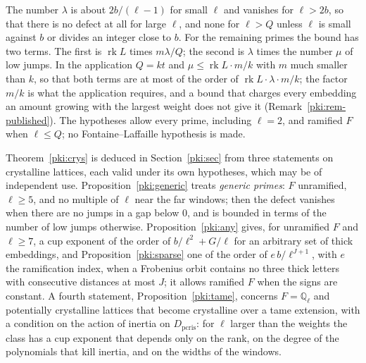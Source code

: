 \documentclass[10pt]{amsart}
\theoremstyle{definition}
\theoremstyle{remark}
\begin{document}
The number $\lambda$ is about $2b/(\ell-1)$ for small $\ell$ and vanishes for $\ell>2b$, so that
there is no defect at all for large $\ell$, and none for $\ell>Q$ unless $\ell$ is small against
$b$ or divides an integer close to $b$. For the remaining primes the bound has two terms. The
first is $\operatorname{rk}L$ times $m\lambda/Q$; the second is $\lambda$ times the number $\mu$ of
low jumps. In the application $Q=kt$ and $\mu\le\operatorname{rk}L\cdot m/k$ with $m$ much
smaller than $k$, so that both terms are at most of the order of
$\operatorname{rk}L\cdot\lambda\cdot m/k$; the factor $m/k$ is what the application requires, and
a bound that charges every embedding an amount growing with the largest weight does not give it
(Remark~\ref{pki:rem-published}). The hypotheses allow every prime, including $\ell=2$, and
ramified $F$ when $\ell\le Q$; no Fontaine--Laffaille hypothesis is made.

Theorem~\ref{pki:crys} is deduced in Section~\ref{pki:sec} from three statements on crystalline
lattices, each valid under its own hypotheses, which may be of independent use.
Proposition~\ref{pki:generic} treats \emph{generic primes}: $F$ unramified, $\ell\ge5$, and no
multiple of $\ell$ near the far windows; then the defect vanishes when there are no jumps in a gap
below $0$, and is bounded in terms of the number of low jumps otherwise. Proposition~\ref{pki:any} gives, for unramified $F$ and $\ell\ge7$, a
cup exponent of the order of $b/\ell^2+G/\ell$ for an arbitrary set of thick embeddings, and
Proposition~\ref{pki:sparse} one of the order of $e\,b/\ell^{J+1}$, with $e$ the ramification
index, when a Frobenius orbit contains no three thick letters with consecutive distances at most
$J$; it allows ramified $F$ when the signs are constant. A fourth statement,
Proposition~\ref{pki:tame}, concerns $F=\mathbb Q_\ell$ and potentially crystalline lattices that
become crystalline over a tame extension, with a condition on the action of inertia on
$D_{\mathrm{pcris}}$: for $\ell$ larger than the weights the class has a cup exponent that
depends only on the rank, on the degree of the polynomials that kill inertia, and on the widths
of the windows.
\end{document}
